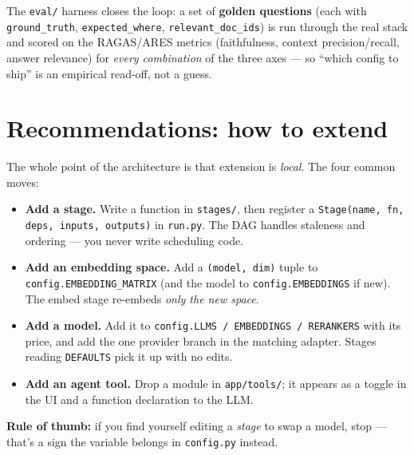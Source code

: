 \documentclass[11pt]{article}
\newcommand{\code}[1]{\texttt{#1}}
\begin{document}
The \code{eval/} harness closes the loop: a set of \textbf{golden questions} (each with
\code{ground\_truth}, \code{expected\_where}, \code{relevant\_doc\_ids}) is run through the real stack
and scored on the RAGAS/ARES metrics (faithfulness, context precision/recall, answer relevance) for
\emph{every combination} of the three axes --- so ``which config to ship'' is an empirical read-off,
not a guess.

\FloatBarrier
\section{Recommendations: how to extend}

The whole point of the architecture is that extension is \emph{local}. The four common moves:

\begin{itemize}[leftmargin=1.4em, itemsep=2pt]
  \item \textbf{Add a stage.} Write a function in \code{stages/}, then register a
        \code{Stage(name, fn, deps, inputs, outputs)} in \code{run.py}. The DAG handles staleness and
        ordering --- you never write scheduling code.
  \item \textbf{Add an embedding space.} Add a \code{(model, dim)} tuple to
        \code{config.EMBEDDING\_MATRIX} (and the model to \code{config.EMBEDDINGS} if new). The embed
        stage re-embeds \emph{only the new space}.
  \item \textbf{Add a model.} Add it to \code{config.LLMS / EMBEDDINGS / RERANKERS} with its price,
        and add the one provider branch in the matching adapter. Stages reading \code{DEFAULTS} pick
        it up with no edits.
  \item \textbf{Add an agent tool.} Drop a module in \code{app/tools/}; it appears as a toggle in the
        UI and a function declaration to the LLM.
\end{itemize}

\begin{tcolorbox}[colback=blue!4, colframe=blue!50!black, sharp corners, boxrule=0.5pt]
\textbf{Rule of thumb:} if you find yourself editing a \emph{stage} to swap a model, stop --- that's a
sign the variable belongs in \code{config.py} instead.
\end{tcolorbox}

\end{document}

